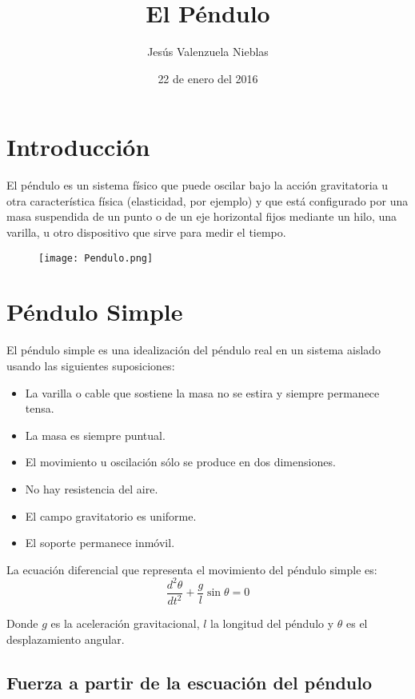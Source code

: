 \documentclass[12pt]{article}
\title{ El Péndulo}
\author{Jesús Valenzuela Nieblas}
\date{22 de enero del 2016}
\begin{document}
\maketitle
\pagebreak


\section{Introducción}
El péndulo es un sistema físico que puede oscilar bajo la acción gravitatoria u otra característica física (elasticidad, por ejemplo) y que está configurado por una masa suspendida de un punto o de un eje horizontal fijos mediante un hilo, una varilla, u otro dispositivo que sirve para medir el tiempo.
\begin{figure}[H]
\centering		 			
\texttt{[image: Pendulo.png]}
\end{figure}
\section{Péndulo Simple}
El péndulo simple es una idealización del péndulo real en un sistema aislado usando las siguientes suposiciones:
\begin{itemize}
\item La varilla o cable que sostiene la masa no se estira y siempre permanece tensa.
\item La masa es siempre puntual.
\item El movimiento u oscilación sólo se produce en dos dimensiones.
\item No hay resistencia del aire.
\item El campo gravitatorio es uniforme.
\item El soporte permanece inmóvil.
\end{itemize}

La ecuación diferencial que representa el movimiento del péndulo simple es:
\begin{equation}
\frac{d^2 \theta}{d t^2}+\frac{g}{l}\sin \theta=0
\end{equation}

Donde $g$ es la aceleración gravitacional, $l$ la longitud del péndulo y $\theta$ es el desplazamiento angular.

\subsection{Fuerza a partir de la escuación del péndulo}
\end{document}
